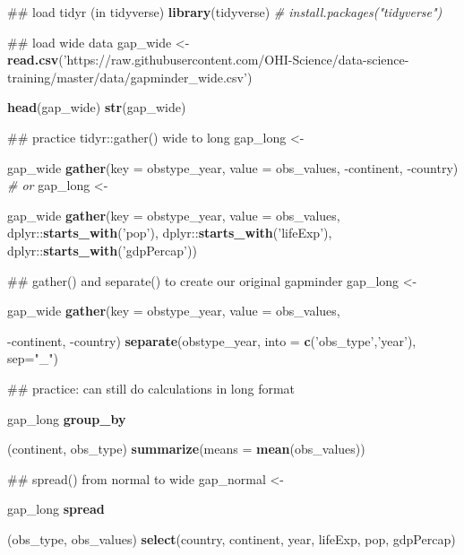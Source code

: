 \documentclass[]{book}
\newenvironment{Shaded}{\begin{snugshade}}{\end{snugshade}}
\newcommand{\KeywordTok}[1]{\textcolor[rgb]{0.13,0.29,0.53}{\textbf{{#1}}}}
\newcommand{\DataTypeTok}[1]{\textcolor[rgb]{0.13,0.29,0.53}{{#1}}}
\newcommand{\StringTok}[1]{\textcolor[rgb]{0.31,0.60,0.02}{{#1}}}
\newcommand{\CommentTok}[1]{\textcolor[rgb]{0.56,0.35,0.01}{\textit{{#1}}}}
\newcommand{\NormalTok}[1]{{#1}}
\theoremstyle{definition}
\theoremstyle{definition}
\theoremstyle{definition}
\theoremstyle{remark}
\begin{document}
\begin{Shaded}
\begin{Highlighting}[]
\NormalTok{## load tidyr (in tidyverse)}
\KeywordTok{library}\NormalTok{(tidyverse) }\CommentTok{# install.packages("tidyverse")}

\NormalTok{## load wide data}
\NormalTok{gap_wide <-}\StringTok{ }\KeywordTok{read.csv}\NormalTok{(}\StringTok{'https://raw.githubusercontent.com/OHI-Science/data-science-training/master/data/gapminder_wide.csv'}\NormalTok{)}

\KeywordTok{head}\NormalTok{(gap_wide)}
\KeywordTok{str}\NormalTok{(gap_wide)}

\NormalTok{## practice tidyr::gather() wide to long}
\NormalTok{gap_long <-}\StringTok{ }\NormalTok{gap_wide %
\StringTok{  }\KeywordTok{gather}\NormalTok{(}\DataTypeTok{key   =} \NormalTok{obstype_year,}
         \DataTypeTok{value =} \NormalTok{obs_values,}
         \NormalTok{-continent, -country) }
\CommentTok{# or }
\NormalTok{gap_long <-}\StringTok{ }\NormalTok{gap_wide %
\StringTok{  }\KeywordTok{gather}\NormalTok{(}\DataTypeTok{key   =} \NormalTok{obstype_year,}
         \DataTypeTok{value =} \NormalTok{obs_values,}
         \NormalTok{dplyr::}\KeywordTok{starts_with}\NormalTok{(}\StringTok{'pop'}\NormalTok{),}
         \NormalTok{dplyr::}\KeywordTok{starts_with}\NormalTok{(}\StringTok{'lifeExp'}\NormalTok{),}
         \NormalTok{dplyr::}\KeywordTok{starts_with}\NormalTok{(}\StringTok{'gdpPercap'}\NormalTok{))}

\NormalTok{## gather() and separate() to create our original gapminder}
\NormalTok{gap_long <-}\StringTok{ }\NormalTok{gap_wide %
\StringTok{  }\KeywordTok{gather}\NormalTok{(}\DataTypeTok{key   =} \NormalTok{obstype_year,}
         \DataTypeTok{value =} \NormalTok{obs_values,}
         \NormalTok{-continent, -country) %
\StringTok{  }\KeywordTok{separate}\NormalTok{(obstype_year,}
           \DataTypeTok{into =} \KeywordTok{c}\NormalTok{(}\StringTok{'obs_type'}\NormalTok{,}\StringTok{'year'}\NormalTok{),}
           \DataTypeTok{sep=}\StringTok{"_"}\NormalTok{)}

\NormalTok{## practice: can still do calculations in long format}
\NormalTok{gap_long %
\StringTok{  }\KeywordTok{group_by}\NormalTok{(continent, obs_type) %
\StringTok{  }\KeywordTok{summarize}\NormalTok{(}\DataTypeTok{means =} \KeywordTok{mean}\NormalTok{(obs_values))}

\NormalTok{## spread() from normal to wide}
\NormalTok{gap_normal <-}\StringTok{ }\NormalTok{gap_long %
\StringTok{  }\KeywordTok{spread}\NormalTok{(obs_type, obs_values) %
\StringTok{  }\KeywordTok{select}\NormalTok{(country, continent, year, lifeExp, pop, gdpPercap)}

}}}}}}}}
\end{Highlighting}
\end{Shaded}
\end{document}
